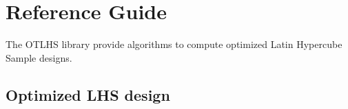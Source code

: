 %


\section{Reference Guide}

The OTLHS library provide algorithms to compute optimized Latin Hypercube Sample designs.

\subsection{Optimized LHS design}

